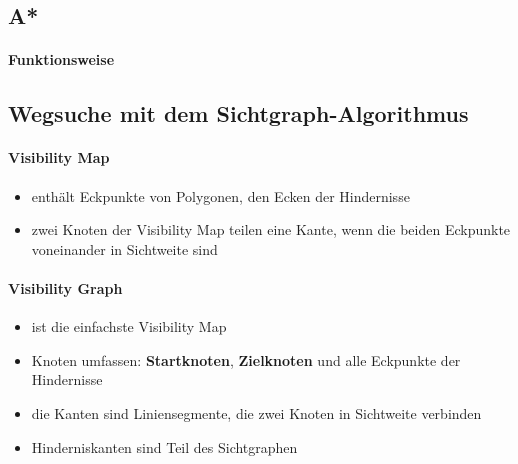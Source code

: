 \subsection{A*}
\paragraph{Funktionsweise}
\subsection{Wegsuche mit dem Sichtgraph-Algorithmus}
\paragraph{Visibility Map}
\begin{itemize}
	\item enthält Eckpunkte von Polygonen, den Ecken der Hindernisse
	\item zwei Knoten der Visibility Map teilen eine Kante, wenn die beiden Eckpunkte voneinander in Sichtweite sind
\end{itemize}
\paragraph{Visibility Graph}
\begin{itemize}
	\item ist die einfachste Visibility Map
	\item Knoten umfassen: \textbf{Startknoten}, \textbf{Zielknoten} und alle Eckpunkte der Hindernisse
	\item die Kanten sind Liniensegmente, die zwei Knoten in Sichtweite verbinden
	\item Hinderniskanten sind Teil des Sichtgraphen
\end{itemize}
